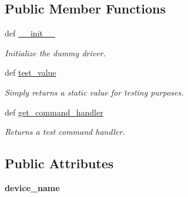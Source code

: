 \subsection*{Public Member Functions}
\begin{DoxyCompactItemize}
\item 
def \hyperlink{classhwm_1_1hardware_1_1devices_1_1drivers_1_1test__driver_1_1test__driver_1_1_test___driver_a3611f6f892efe0b888adcff7fc3b7afc}{\-\_\-\-\_\-init\-\_\-\-\_\-}
\begin{DoxyCompactList}\small\item\em Initialize the dummy driver. \end{DoxyCompactList}\item 
\hypertarget{classhwm_1_1hardware_1_1devices_1_1drivers_1_1test__driver_1_1test__driver_1_1_test___driver_ae038b9f574c348f541d43426616e9599}{def \hyperlink{classhwm_1_1hardware_1_1devices_1_1drivers_1_1test__driver_1_1test__driver_1_1_test___driver_ae038b9f574c348f541d43426616e9599}{test\-\_\-value}}\label{classhwm_1_1hardware_1_1devices_1_1drivers_1_1test__driver_1_1test__driver_1_1_test___driver_ae038b9f574c348f541d43426616e9599}

\begin{DoxyCompactList}\small\item\em Simply returns a static value for testing purposes. \end{DoxyCompactList}\item 
def \hyperlink{classhwm_1_1hardware_1_1devices_1_1drivers_1_1test__driver_1_1test__driver_1_1_test___driver_ace95f1f9c601f61833c365a2679b0219}{get\-\_\-command\-\_\-handler}
\begin{DoxyCompactList}\small\item\em Returns a test command handler. \end{DoxyCompactList}\end{DoxyCompactItemize}
\subsection*{Public Attributes}
\begin{DoxyCompactItemize}
\item 
\hypertarget{classhwm_1_1hardware_1_1devices_1_1drivers_1_1test__driver_1_1test__driver_1_1_test___driver_afa98951e1c9ee1f0371c45b73e0c4cdb}{{\bfseries device\-\_\-name}}\label{classhwm_1_1hardware_1_1devices_1_1drivers_1_1test__driver_1_1test__driver_1_1_test___driver_afa98951e1c9ee1f0371c45b73e0c4cdb}

\end{DoxyCompactItemize}
